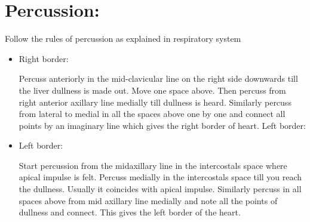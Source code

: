 \documentclass[a4paper,12pt,openany,oneside]{book}
\begin{document}
\section*{Percussion:}
\par
Follow the rules of percussion as explained in respiratory system 
\begin{itemize}
\item{Right border:
	\par
Percuss anteriorly in the mid-clavicular line on the right side downwards till the liver dullness is made out. Move one space above. Then percuss from right anterior axillary line medially till dullness is heard. Similarly percuss from lateral to medial in all the spaces above one by one and connect all points by an imaginary line which gives the right border of heart. Left border:
}
\item{Left border:
	\par
Start percussion from the midaxillary line in the intercostals space where apical impulse is felt. Percuss medially in the intercostals space till you reach the dullness. Usually it coincides with apical impulse. Similarly percuss in all spaces above from mid axillary line medially and note all the points of dullness and connect. This gives the left border of the heart.
}
\end{itemize}
\end{document}
